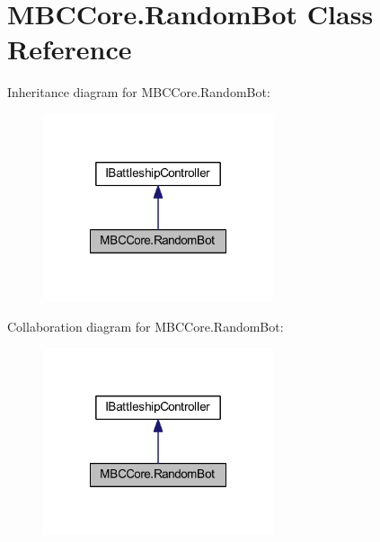 \hypertarget{class_m_b_c_core_1_1_random_bot}{\section{M\-B\-C\-Core.\-Random\-Bot Class Reference}
\label{class_m_b_c_core_1_1_random_bot}
}


Inheritance diagram for M\-B\-C\-Core.\-Random\-Bot\-:\nopagebreak
\begin{figure}[H]
\begin{center}
\leavevmode
\includegraphics[width=192pt]{class_m_b_c_core_1_1_random_bot__inherit__graph}
\end{center}
\end{figure}


Collaboration diagram for M\-B\-C\-Core.\-Random\-Bot\-:\nopagebreak
\begin{figure}[H]
\begin{center}
\leavevmode
\includegraphics[width=192pt]{class_m_b_c_core_1_1_random_bot__coll__graph}
\end{center}
\end{figure}
